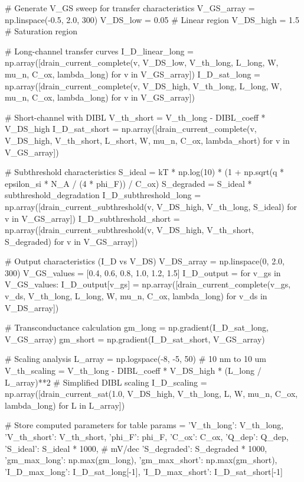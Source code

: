 \documentclass[a4paper, 11pt]{article}
\begin{document}
\begin{pycode}
# Generate V_GS sweep for transfer characteristics
V_GS_array = np.linspace(-0.5, 2.0, 300)
V_DS_low = 0.05  # Linear region
V_DS_high = 1.5  # Saturation region

# Long-channel transfer curves
I_D_linear_long = np.array([drain_current_complete(v, V_DS_low, V_th_long, L_long, W, mu_n, C_ox, lambda_long)
                             for v in V_GS_array])
I_D_sat_long = np.array([drain_current_complete(v, V_DS_high, V_th_long, L_long, W, mu_n, C_ox, lambda_long)
                         for v in V_GS_array])

# Short-channel with DIBL
V_th_short = V_th_long - DIBL_coeff * V_DS_high
I_D_sat_short = np.array([drain_current_complete(v, V_DS_high, V_th_short, L_short, W, mu_n, C_ox, lambda_short)
                          for v in V_GS_array])

# Subthreshold characteristics
S_ideal = kT * np.log(10) * (1 + np.sqrt(q * epsilon_si * N_A / (4 * phi_F)) / C_ox)
S_degraded = S_ideal * subthreshold_degradation
I_D_subthreshold_long = np.array([drain_current_subthreshold(v, V_DS_high, V_th_long, S_ideal)
                                   for v in V_GS_array])
I_D_subthreshold_short = np.array([drain_current_subthreshold(v, V_DS_high, V_th_short, S_degraded)
                                    for v in V_GS_array])

# Output characteristics (I_D vs V_DS)
V_DS_array = np.linspace(0, 2.0, 300)
V_GS_values = [0.4, 0.6, 0.8, 1.0, 1.2, 1.5]
I_D_output = {}
for v_gs in V_GS_values:
    I_D_output[v_gs] = np.array([drain_current_complete(v_gs, v_ds, V_th_long, L_long, W, mu_n, C_ox, lambda_long)
                                 for v_ds in V_DS_array])

# Transconductance calculation
gm_long = np.gradient(I_D_sat_long, V_GS_array)
gm_short = np.gradient(I_D_sat_short, V_GS_array)

# Scaling analysis
L_array = np.logspace(-8, -5, 50)  # 10 nm to 10 um
V_th_scaling = V_th_long - DIBL_coeff * V_DS_high * (L_long / L_array)**2  # Simplified DIBL scaling
I_D_scaling = np.array([drain_current_sat(1.0, V_DS_high, V_th_long, L, W, mu_n, C_ox, lambda_long)
                        for L in L_array])

# Store computed parameters for table
params = {
    'V_th_long': V_th_long,
    'V_th_short': V_th_short,
    'phi_F': phi_F,
    'C_ox': C_ox,
    'Q_dep': Q_dep,
    'S_ideal': S_ideal * 1000,  # mV/dec
    'S_degraded': S_degraded * 1000,
    'gm_max_long': np.max(gm_long),
    'gm_max_short': np.max(gm_short),
    'I_D_max_long': I_D_sat_long[-1],
    'I_D_max_short': I_D_sat_short[-1]
}


\end{pycode}
\end{document}
